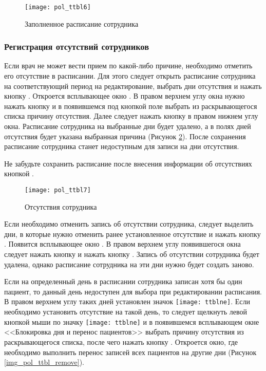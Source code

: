 {\begin{figure}[ht]\centering
 \texttt{[image: pol\_ttbl6]}
 \caption{Заполненное расписание сотрудника}
 \label{img_pol_ttbl6}
\end{figure}

\subsubsection{Регистрация отсутствий сотрудников}

Если врач не может вести прием по какой-либо причине, необходимо отметить его отсутствие в расписании. Для этого следует открыть расписание сотрудника на соответствующий период на редактирование, выбрать дни отсутствия и нажать кнопку . Откроется всплывающее окно . В правом верхнем углу окна нужно нажать кнопку  и в появившемся под кнопкой поле выбрать из раскрывающегося списка причину отсутствия. Далее следует нажать кнопку  в правом нижнем углу окна. Расписание сотрудника на выбранные дни будет удалено, а в полях дней отсутствия будет указана выбранная причина (Рисунок \ref{img_pol_ttbl7}). После сохранения  расписание сотрудника станет недоступным для записи на дни отсутствия.

\begin{vnim}
 Не забудьте сохранить расписание после внесения информации об отсутствиях кнопкой .
\end{vnim} 

\begin{figure}[ht]\centering
 \texttt{[image: pol\_ttbl7]}
 \caption{Отсутствия сотрудника}
 \label{img_pol_ttbl7}
\end{figure}

Если необходимо отменить запись об отсутствии сотрудника, следует выделить дни, в которые нужно отменить ранее установленное отсутствие и нажать кнопку . Появится всплывающее окно . В правом верхнем углу появившегося окна следует нажать кнопку  и нажать кнопку . Запись об отсутствии сотрудника будет удалена, однако расписание сотрудника на эти дни нужно будет создать заново.

Если на определенный день в расписании сотрудника записан хотя бы один пациент, то данный день недоступен для выбора при редактировании расписания. В правом верхнем углу таких дней установлен значок \texttt{[image: ttblne]}. Если необходимо установить отсутствие на такой день, то следует щелкнуть левой кнопкой мыши по значку \texttt{[image: ttblne]} и в появившемся всплывающем окне <<Блокировка дня и перенос пациентов>> выбрать причину отсутствия из раскрывающегося списка, после чего нажать кнопку . Откроется окно, где необходимо выполнить перенос записей всех пациентов на другие дни (Рисунок \ref{img_pol_ttbl_remove}). 

}
